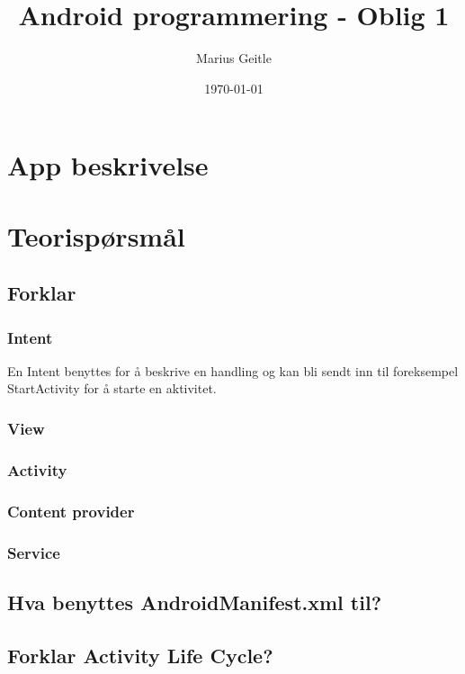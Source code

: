 \documentclass[a4paper, 12pt]{article}
\begin{document}
\title{Android programmering - Oblig 1}
\date{\today}
\author{Marius Geitle}

\maketitle

\section{App beskrivelse}

\section{Teorispørsmål}
\subsection*{Forklar}
\subsubsection*{Intent}
En Intent benyttes for å beskrive en handling og kan bli sendt inn til foreksempel StartActivity for å starte en aktivitet.

\subsubsection*{View}


\subsubsection*{Activity}
\subsubsection*{Content provider}
\subsubsection*{Service}
\subsection*{Hva benyttes AndroidManifest.xml til?}
\subsection*{Forklar Activity Life Cycle?}
\end{document}
